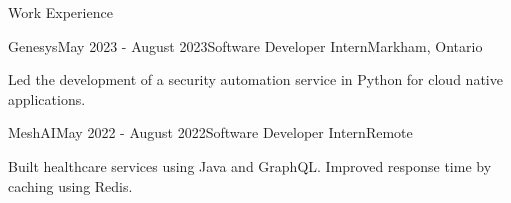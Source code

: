 \documentclass[
	12pt, %
]{resume} %
\begin{document}

\begin{rSection}{Work Experience}

	\begin{rSubsection}{Genesys}{May 2023 - August 2023}{Software Developer Intern}{Markham, Ontario}
		\item Led the development of a security automation service in Python for cloud native applications.
	\end{rSubsection}


	\begin{rSubsection}{MeshAI}{May 2022 - August 2022}{Software Developer Intern}{Remote}
		\item Built healthcare services using Java and GraphQL. Improved response time by caching using Redis.
	\end{rSubsection}



\end{rSection}
\end{document}
